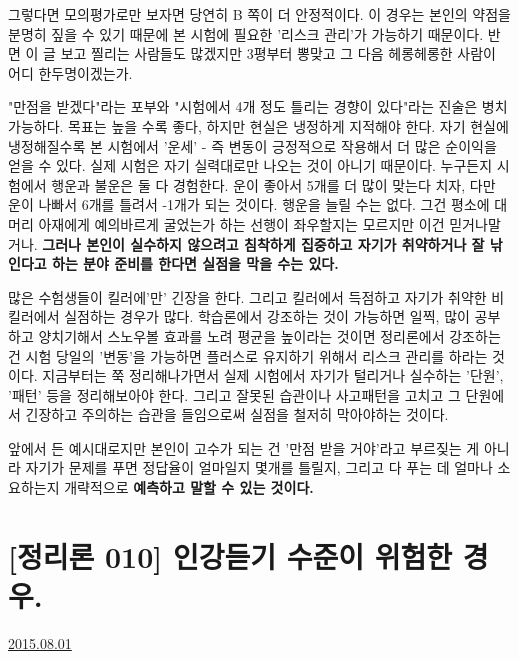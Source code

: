 그렇다면 모의평가로만 보자면 당연히 B 쪽이 더 안정적이다.
이 경우는 본인의 약점을 분명히 짚을 수 있기 때문에 본 시험에 필요한 '리스크 관리'가 가능하기 때문이다.
반면 이 글 보고 찔리는 사람들도 많겠지만 3평부터 뽕맞고 그 다음 헤롱헤롱한 사람이 어디 한두명이겠는가.
\vspace{5mm}

"만점을 받겠다"라는 포부와 "시험에서 4개 정도 틀리는 경향이 있다"라는 진술은 병치가능하다.
목표는 높을 수록 좋다, 하지만 현실은 냉정하게 지적해야 한다.
자기 현실에 냉정해질수록 본 시험에서 '운세' - 즉 변동이 긍정적으로 작용해서 더 많은 순이익을 얻을 수 있다.
실제 시험은 자기 실력대로만 나오는 것이 아니기 때문이다.
누구든지 시험에서 행운과 불운은 둘 다 경험한다. 운이 좋아서 5개를 더 많이 맞는다 치자, 다만 운이 나빠서 6개를 틀려서 -1개가 되는 것이다.
행운을 늘릴 수는 없다. 그건 평소에 대머리 아재에게 예의바르게 굴었는가 하는 선행이 좌우할지는 모르지만 이건 믿거나말거나.
\textbf{그러나 본인이 실수하지 않으려고 침착하게 집중하고 자기가 취약하거나 잘 낚인다고 하는 분야 준비를 한다면 실점을 막을 수는 있다.}
\vspace{5mm}

많은 수험생들이 킬러에'만' 긴장을 한다. 그리고 킬러에서 득점하고 자기가 취약한 비킬러에서 실점하는 경우가 많다.
학습론에서 강조하는 것이 가능하면 일찍, 많이 공부하고 양치기해서 스노우볼 효과를 노려 평균을 높이라는 것이면
정리론에서 강조하는 건 시험 당일의 '변동'을 가능하면 플러스로 유지하기 위해서 리스크 관리를 하라는 것이다.
지금부터는 쭉 정리해나가면서 실제 시험에서 자기가 털리거나 실수하는 '단원', '패턴' 등을 정리해보아야 한다.
그리고 잘못된 습관이나 사고패턴을 고치고 그 단원에서 긴장하고 주의하는 습관을 들임으로써 실점을 철저히 막아야하는 것이다.
\vspace{5mm}

앞에서 든 예시대로지만 본인이 고수가 되는 건 '만점 받을 거야'라고 부르짖는 게 아니라
자기가 문제를 푸면 정답율이 얼마일지 몇개를 틀릴지, 그리고 다 푸는 데 얼마나 소요하는지 개략적으로 \textbf{예측하고 말할 수 있는 것이다.}
\vspace{5mm}






\section{[정리론 010] 인강듣기 수준이 위험한 경우.}
\href{https://www.kockoc.com/Apoc/226313}{2015.08.01}

\vspace{5mm}

